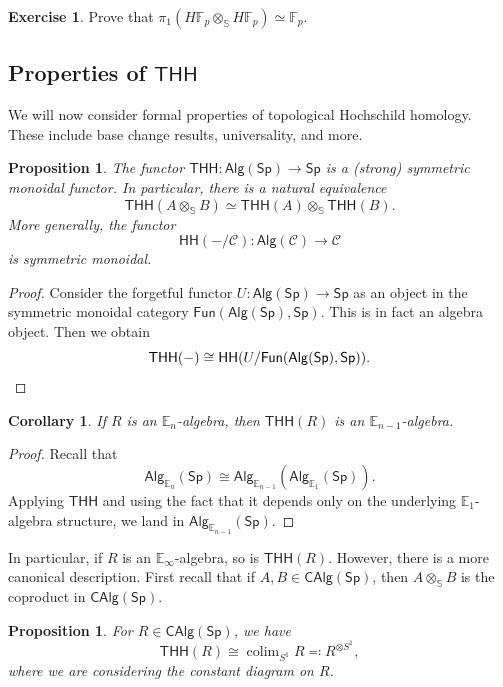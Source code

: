 \documentclass[10pt, oneside]{memoir}
\newtheorem{cor}[thm]{Corollary}
\newtheorem{prop}[thm]{Proposition}
\theoremstyle{definition}
\newtheorem{exer}[thm]{Exercise}
\theoremstyle{remark}
\theoremstyle{plain}
\theoremstyle{definition}
\theoremstyle{remark}
\newcommand{\E}{\mathbb{E}}
\newcommand{\F}{\mathbb{F}}
\newcommand{\bS}{\mathbb{S}}
\newcommand{\mc}[1]{\mathcal{#1}}
\newcommand{\ms}[1]{\mathsf{#1}}
\newcommand{\1}{\mathbf{1}}
\newcommand{\2}{\mathbf{2}}
\newcommand{\3}{\mathbf{3}}
\newcommand{\THH}{\ms{THH}}
\newcommand{\HH}{\ms{HH}}
\DeclareMathOperator*{\colim}{colim}
\begin{document}
\begin{exer}
    Prove that \(\pi_1(H \F_p \otimes_{\bS} H \F_p) \simeq \F_p \).
\end{exer}

\subsection{Properties of \(\THH \)}%

We will now consider formal properties of topological Hochschild homology. These include base change results, universality, and more.

\begin{prop}
    The functor \(\THH \colon \ms{Alg}(\ms{Sp}) \to \ms{Sp} \) is a (strong) symmetric monoidal functor. In particular, there is a natural equivalence
    \[ \THH(A \otimes_{\bS} B) \simeq \THH(A) \otimes_{\bS} \THH(B). \]
    More generally, the functor
    \[ \HH(-/\mc{C}) \colon \ms{Alg}(\mc{C}) \to \mc{C} \]
    is symmetric monoidal.
\end{prop}

\begin{proof}
    Consider the forgetful functor \(U \colon \ms{Alg}(\ms{Sp}) \to \ms{Sp} \) as an object in the symmetric monoidal category \(\ms{Fun}(\ms{Alg}(\ms{Sp}), \ms{Sp}) \). This is in fact an algebra object. Then we obtain
    \[ \THH(-) \cong \HH(U/\ms{Fun}(\ms{Alg}(\ms{Sp}), \ms{Sp})). \qedhere \]
\end{proof}

\begin{cor}
    If \(R \) is an \(\E_n \)-algebra, then \(\THH(R) \) is an \(\E_{n-1} \)-algebra.
\end{cor}

\begin{proof}
    Recall that
    \[ \ms{Alg}_{\E_n}(\ms{Sp}) \cong \ms{Alg}_{\E_{n-1}}(\ms{Alg}_{\E_1}(\ms{Sp})). \]
    Applying \(\THH \) and using the fact that it depends only on the underlying \(\E_1 \)-algebra structure, we land in \(\ms{Alg}_{\E_{n-1}}(\ms{Sp}) \).
\end{proof}

In particular, if \(R \) is an \(\E_{\infty} \)-algebra, so is \(\THH(R) \). However, there is a more canonical description. First recall that if \(A, B \in \ms{CAlg}(\ms{Sp}) \), then \(A \otimes_{\bS} B \) is the coproduct in \(\ms{CAlg}(\ms{Sp}) \).

\begin{prop}
    For \(R \in \ms{CAlg}(\ms{Sp}) \), we have
    \[ \THH(R) \cong \colim_{S^1} R \eqqcolon R^{\otimes S^1}, \]
    where we are considering the constant diagram on \(R \).
\end{prop}
\end{document}
